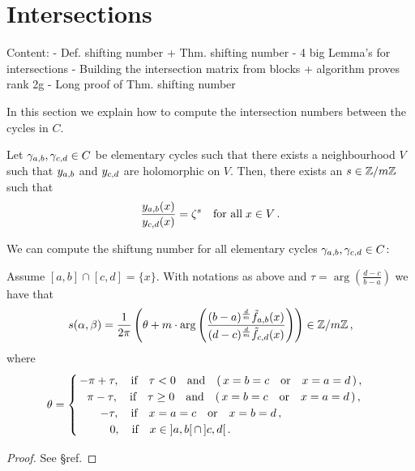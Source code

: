 \documentclass[main.tex]{subfiles}
\begin{document}
  \section{Intersections}\label{sec:intersections}

  Content: - Def. shifting number + Thm. shifting number
	   - 4 big Lemma's for intersections
	   - Building the intersection matrix from blocks + algorithm proves rank 2g
	   - Long proof of Thm. shifting number

	In this section we explain how to compute the intersection numbers between the cycles in $C$. 
	
	\begin{defn}\label{def:shift_numb}
	Let $\gamma_{a,b}, \gamma_{c,d} \in C$ be elementary cycles such that there exists a neighbourhood $V$ such that $y_{a,b}$ and $y_{c,d}$ are holomorphic on $V$. Then, there exists an
	$s \in \mathbb{Z}/m\mathbb{Z}$ such that
	\begin{align}
	 \frac{y_{a,b}(x)}{y_{c,d}(x)} = \zeta^s \quad \text{for all} \; x \in V\,.
	\end{align}
	\end{defn}

	   
	    We can compute the shiftung number for all elementary cycles $\gamma_{a,b}, \gamma_{c,d} \in C$:
    
    \begin{thm}\label{thm:shift_numb}
    Assume $[a,b] \cap [c,d] = \{x\}$. With notations as above and $\tau = \arg \left( \frac{d-c}{b-a} \right)$ we have that
     \begin{align}\label{eq:shift_numb}
       s(\alpha,\beta) = \frac{1}{2\pi} \left( \theta +  m \cdot \arg \left( \frac{(b-a)^{\frac{d}{m}} \tilde{f}_{a,b}(x)}{(d-c)^{\frac{d}{m}} \tilde{f}_{c,d}(x)} \right) \right) \in \mathbb{Z}/m\mathbb{Z}\,,
     \end{align}
     where
      \begin{align*}\theta = \begin{cases}
                              \, -\pi+\tau, \quad \text{if} \quad \tau < 0 \quad \text{and} \quad (\,x = b = c \quad \text{or} \quad x = a = d\,)\,,\\
                              \quad\! \pi-\tau, \quad \text{if} \quad \tau \ge 0 \quad \text{and} \quad (\,x = b = c \quad \text{or} \quad x = a = d\,)\,,\\
                              \hspace{0.7cm} -\tau, \quad \text{if} \quad x = a = c \quad \text{or} \quad x = b = d\,,\\
                              \hspace{1cm} 0, \quad \text{if} \quad x  \in \; ]a,b[ \,\cap\, ]c,d[\,.
                             \end{cases}
     \end{align*}
    \end{thm}
    \begin{proof}
     See \S \todo ref.
    \end{proof}
\end{document}
